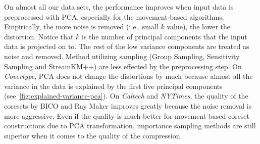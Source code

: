 On almost all our data sets, the performance improves when input data is preprocessed with PCA, especially for the movement-based algorithms. Empirically, the more noise is removed (i.e., small $k$ value), the lower the distortion. Notice that $k$ is the number of principal components that the input data is projected on to. The rest of the low variance components are treated as noise and removed. Method utilizing sampling (Group Sampling, Sensitivity Sampling and StreamKM++) are less effected by the preprocessing step. On \textit{Covertype}, PCA does not change the distortions by much because almost all the variance in the data is explained by the first five principal components (see~\cref{fig:explained-variance-pca}). 
On \textit{Caltech} and \textit{NYTimes}, the quality of the coresets by BICO and Ray Maker improves greatly because the noise removal is more aggressive. Even if the quality is much better for movement-based coreset constructions due to PCA transformation, importance sampling methods are still superior when it comes to the quality of the compression. 

